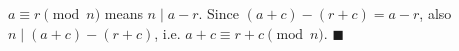 $a\equiv r\pmod n$ means $n\mid a-r$. Since $(a+c)-(r+c)=a-r$, also $n\mid(a+c)-(r+c)$, i.e. $a+c\equiv r+c\pmod n$. $\blacksquare$
